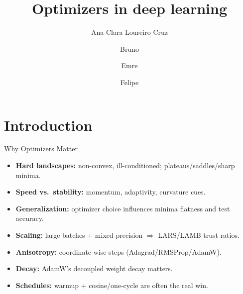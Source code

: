 \documentclass{beamer}
\title{Optimizers in deep learning}
\author{Ana Clara Loureiro Cruz \and Bruno \and Emre \and Felipe}
\begin{document}
\maketitle

\section{Introduction}

\begin{frame}{Why Optimizers Matter}
\begin{itemize}
  \item \textbf{Hard landscapes:} non-convex, ill-conditioned; plateaus/saddles/sharp minima.
  \item \textbf{Speed vs.\ stability:} momentum, adaptivity, curvature cues.
  \item \textbf{Generalization:} optimizer choice influences minima flatness and test accuracy.
  \item \textbf{Scaling:} large batches + mixed precision $\Rightarrow$ LARS/LAMB trust ratios.
  \item \textbf{Anisotropy:} coordinate-wise steps (Adagrad/RMSProp/AdamW).
  \item \textbf{Decay:} AdamW’s decoupled weight decay matters.
  \item \textbf{Schedules:} warmup + cosine/one-cycle are often the real win.
\end{itemize}
\end{frame}
\end{document}
